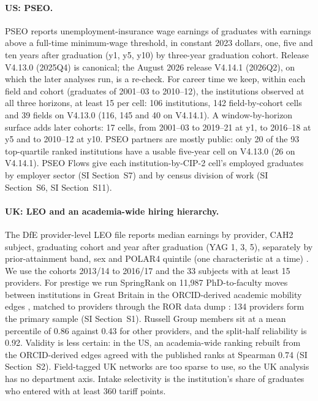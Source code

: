 \documentclass[11pt]{article}
\newcommand{\SI}[1]{SI Section~S#1}
\newcommand{\SItheory}{\SI{11}}
\begin{document}
\paragraph{US: PSEO.} PSEO reports unemployment-insurance wage earnings of graduates with earnings above a
full-time minimum-wage threshold, in constant 2023 dollars, one, five and ten years after graduation (y1, y5, y10)
by three-year graduation cohort. Release V4.13.0 (2025Q4) is canonical; the August 2026 release V4.14.1 (2026Q2),
on which the later analyses run, is a re-check. For career time we keep, within each field and cohort (graduates
of 2001--03 to 2010--12), the institutions observed at all three horizons, at least 15 per cell: 106 institutions,
142 field-by-cohort cells and 39 fields on V4.13.0 (116, 145 and 40 on V4.14.1). A window-by-horizon surface adds
later cohorts: 17 cells, from 2001--03 to 2019--21 at y1, to 2016--18 at y5 and to 2010--12 at y10. PSEO partners
are mostly public: only 20 of the 93 top-quartile ranked institutions have a usable five-year cell on V4.13.0 (26
on V4.14.1). PSEO Flows give each institution-by-CIP-2 cell's employed graduates by employer sector (\SI{7}) and by
census division of work (\SI{6}, \SItheory).

\paragraph{UK: LEO and an academia-wide hiring hierarchy.} The DfE provider-level LEO file reports median
earnings by provider, CAH2 subject, graduating cohort and year after graduation (YAG 1, 3, 5), separately by
prior-attainment band, sex and POLAR4 quintile (one characteristic at a time) \citep{dfe_leo_provider}. We use
the cohorts 2013/14 to 2016/17 and the 33 subjects with at least 15 providers. For prestige we run SpringRank on
11,987 PhD-to-faculty moves between institutions in Great Britain in the ORCID-derived academic mobility edges
\citep{li2026orcid, orcid}, matched to providers through the ROR data dump \citep{ror2026data}: 134 providers form
the primary sample (\SI{1}). Russell Group members sit at a mean percentile of 0.86 against 0.43 for other
providers, and the split-half reliability is 0.92. Validity is less certain: in the US, an academia-wide ranking
rebuilt from the ORCID-derived edges agreed with the published ranks at Spearman 0.74 (\SI{2}). Field-tagged UK
networks are too sparse to use, so the UK analysis has no department axis. Intake selectivity is the
institution's share of graduates who entered with at least 360 tariff points.
\end{document}
